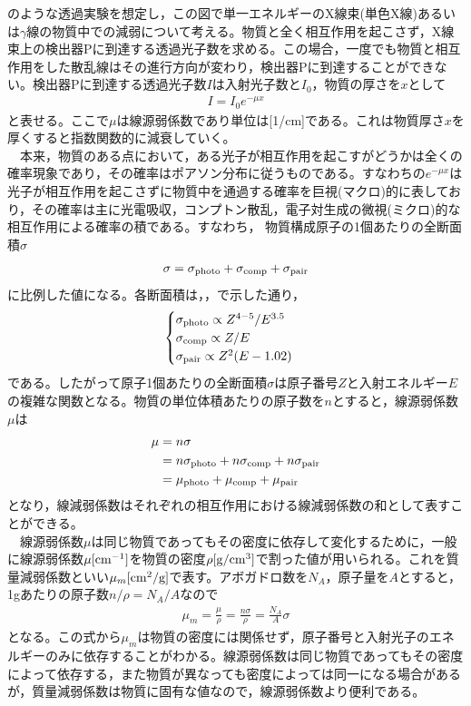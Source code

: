 のような透過実験を想定し，この図で単一エネルギーのX線束(単色X線)あるいは$\gamma$線の物質中での減弱について考える。物質と全く相互作用を起こさず，X線束上の検出器Pに到達する透過光子数を求める。この場合，一度でも物質と相互作用をした散乱線はその進行方向が変わり，検出器Pに到達することができない。検出器Pに到達する透過光子数$I$は入射光子数と$I_0$，物質の厚さを$x$として
\begin{align}
I=I_0e^{-\mu x} \label{eq:atten}
\end{align}
と表せる。ここで$\mu$は線源弱係数であり単位は[1/cm]である。これは物質厚さ$x$を厚くすると指数関数的に減衰していく。\\
\ \ 本来，物質のある点において，ある光子が相互作用を起こすがどうかは全くの確率現象であり，その確率はポアソン分布に従うものである。すなわちの$e^{-\mu x}$は光子が相互作用を起こさずに物質中を通過する確率を巨視(マクロ)的に表しており，その確率は主に光電吸収，コンプトン散乱，電子対生成の微視(ミクロ)的な相互作用による確率の積である。すなわち，
物質構成原子の1個あたりの全断面積$\sigma$
\begin{align}
\sigma=\sigma_{\rm photo}+\sigma_{\rm comp}+\sigma_{\rm pair} \label{eq:sigma_all}
\end{align}
に比例した値になる。各断面積は，，で示した通り，
\begin{align}
\begin{cases}
\sigma_{\rm photo}\propto Z^{4-5}/E^{3.5}\\
\sigma_{\rm comp}\propto Z/E\\
\sigma_{\rm pair}\propto Z^2(E-1.02)
\end{cases}
\end{align}
である。したがって原子1個あたりの全断面積$\sigma$は原子番号$Z$と入射エネルギー$E$の複雑な関数となる。物質の単位体積あたりの原子数を$n$とすると，線源弱係数$\mu$は
\begin{align}
\mu&=n\sigma \\
&=n\sigma_{\rm photo}+n\sigma_{\rm comp}+n\sigma_{\rm pair}\\
&=\mu_{\rm photo}+\mu_{\rm comp}+\mu_{\rm pair}
\end{align}
となり，線減弱係数はそれぞれの相互作用における線減弱係数の和として表すことができる。\\
\ \ 線源弱係数$\mu$は同じ物質であってもその密度に依存して変化するために，一般に線源弱係数$\mu[\rm cm^{-1}]$を物質の密度$\rho[\rm g/cm^{3}]$で割った値が用いられる。これを質量減弱係数といい$\mu_m[\rm cm^2/g]$で表す。アボガドロ数を$N_A$，原子量を$A$とすると，1gあたりの原子数$n/\rho=N_A/A$なので%
\begin{align}
\mu_m=\frac{\mu}{\rho}=\frac{n\sigma}{\rho}=\frac{N_A}{A}\sigma \label{eq:mass_atten}
\end{align}
となる。この式から$\mu_m$は物質の密度には関係せず，原子番号と入射光子のエネルギーのみに依存することがわかる。線源弱係数は同じ物質であってもその密度によって依存する，また物質が異なっても密度によっては同一になる場合があるが，質量減弱係数は物質に固有な値なので，線源弱係数より便利である。\\


